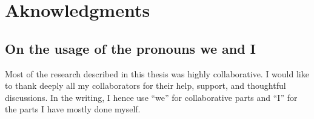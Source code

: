 \chapter*{Aknowledgments}




\newpage
\section*{On the usage of the pronouns we and I}

Most of the research described in this thesis was highly collaborative.
I would like to thank deeply all my collaborators for their help, support, and thoughtful discussions.
In the writing, I hence use ``we'' for collaborative parts and ``I'' for the parts I have mostly done myself.






















